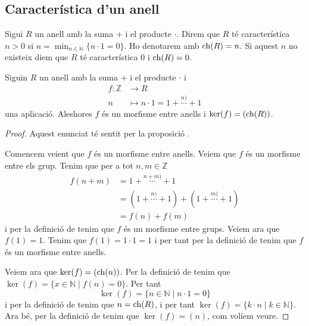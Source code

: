 \documentclass[../Apunts.tex]{subfiles}
\begin{document}
	\subsection{Característica d'un anell}
	\begin{definition}[Característica]
		\label{def:característica d'un anell}
		Sigui \(R\) un anell amb la suma \(+\) i el producte \(\cdot\). Direm que \(R\) té característica \(n>0\) si \(n=\min_{n\in\mathbb{N}}\{n\cdot1=0\}\). Ho denotarem amb \(\operatorname{ch}(R)=n\). Si aquest \(n\) no existeix diem que \(R\) té característica \(0\) i \(\operatorname{ch}(R)=0\).
	\end{definition}
	\begin{proposition}
		\label{prop:morfisme entre anells per trobar característica}
		Siguin \(R\) un anell amb la suma \(+\) i el producte \(\cdot\) i
		\begin{align*}
		f\colon\mathbb{Z}&\longrightarrow R\\
		n&\longmapsto n\cdot1=1+\overset{n)}{\cdots}+1
		\end{align*}
		una aplicació. Aleshores \(f\) és un morfisme entre anells i \(\operatorname*{ker}(f)=(\operatorname{ch}(R))\).
		\begin{proof}
			Aquest enunciat té sentit per la proposició . %
			
			Comencem veient que \(f\) és un morfisme entre anells. Veiem que \(f\) és un morfisme entre els grup. Tenim que per a tot \(n,m\in\mathbb{Z}\)
			\begin{align*}
			f(n+m)&=1+\overset{n+m)}{\cdots}+1\\
			&=(1+\overset{n)}{\cdots}+1)+(1+\overset{m)}{\cdots}+1)\\
			&=f(n)+f(m)
			\end{align*}
			i per la definició de  tenim que \(f\) és un morfisme entre grups. Veiem ara que \(f(1)=1\). Tenim que \(f(1)=1\cdot1=1\) i per tant per la definició de  tenim que \(f\) és un morfisme entre anells.
			
			Veiem ara que \(\operatorname*{ker}(f)=(\operatorname{ch}(n))\). Per la definició de  tenim que \(\ker(f)=\{x\in\mathbb{N}\mid f(n)=0\}\).	Per tant
			\[\ker(f)=\{n\in\mathbb{N}\mid n\cdot1=0\}\]
			i per la definició de  tenim que \(n=\operatorname{ch}(R)\), i per tant \(\ker(f)=\{k\cdot n\mid k\in\mathbb{N}\}\). Ara bé, per la definició de  tenim que \(\ker(f)=(n)\), com volíem veure.
		\end{proof}
	\end{proposition}
\end{document}
